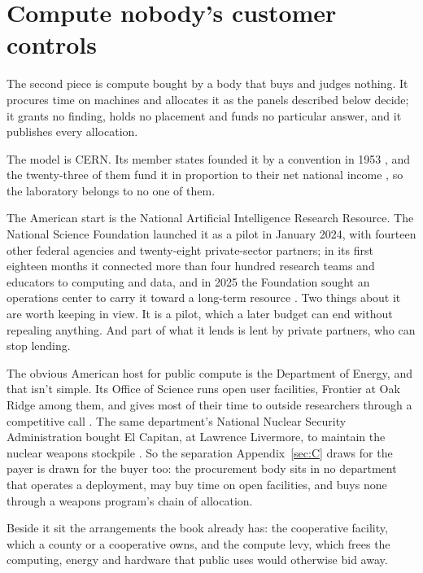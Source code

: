 \section{Compute nobody's customer controls}
\label{sec:28.4}
The second piece is compute bought by a body that buys and judges nothing. It procures time on machines and allocates it as the panels described below decide; it grants no finding, holds no placement and funds no particular answer, and it publishes every allocation.

The model is CERN. Its member states founded it by a convention in 1953 \autocite{cern1953convention}, and the twenty-three of them fund it in proportion to their net national income \autocite{cern2026participation}, so the laboratory belongs to no one of them.

The American start is the National Artificial Intelligence Research Resource. The National Science Foundation launched it as a pilot in January 2024, with fourteen other federal agencies and twenty-eight private-sector partners; in its first eighteen months it connected more than four hundred research teams and educators to computing and data, and in 2025 the Foundation sought an operations center to carry it toward a long-term resource \autocite{nsf2025nairroc}. Two things about it are worth keeping in view. It is a pilot, which a later budget can end without repealing anything. And part of what it lends is lent by private partners, who can stop lending.

The obvious American host for public compute is the Department of Energy, and that isn't simple. Its Office of Science runs open user facilities, Frontier at Oak Ridge among them, and gives most of their time to outside researchers through a competitive call \autocite{ornl2023incite}. The same department's National Nuclear Security Administration bought El Capitan, at Lawrence Livermore, to maintain the nuclear weapons stockpile \autocite{nnsa2019elcapitan}. So the separation Appendix~\ref{sec:C} draws for the payer is drawn for the buyer too: the procurement body sits in no department that operates a deployment, may buy time on open facilities, and buys none through a weapons program's chain of allocation.

Beside it sit the arrangements the book already has: the cooperative facility, which a county or a cooperative owns, and the compute levy, which frees the computing, energy and hardware that public uses would otherwise bid away.
